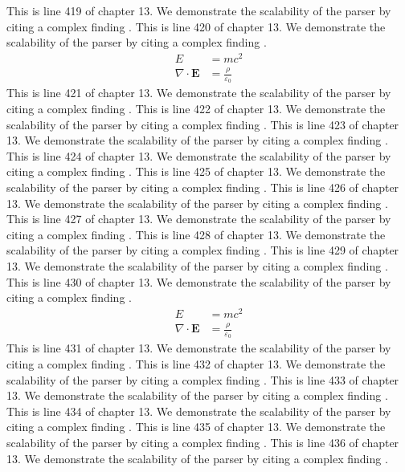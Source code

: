 This is line 419 of chapter 13. We demonstrate the scalability of the parser by citing a complex finding \cite{ref13_419}.
This is line 420 of chapter 13. We demonstrate the scalability of the parser by citing a complex finding \cite{ref13_420}.
\begin{align*}
  E &= mc^2 \\
  \nabla \cdot \mathbf{E} &= \frac{\rho}{\varepsilon_0}
\end{align*}
This is line 421 of chapter 13. We demonstrate the scalability of the parser by citing a complex finding \cite{ref13_421}.
This is line 422 of chapter 13. We demonstrate the scalability of the parser by citing a complex finding \cite{ref13_422}.
This is line 423 of chapter 13. We demonstrate the scalability of the parser by citing a complex finding \cite{ref13_423}.
This is line 424 of chapter 13. We demonstrate the scalability of the parser by citing a complex finding \cite{ref13_424}.
This is line 425 of chapter 13. We demonstrate the scalability of the parser by citing a complex finding \cite{ref13_425}.
This is line 426 of chapter 13. We demonstrate the scalability of the parser by citing a complex finding \cite{ref13_426}.
This is line 427 of chapter 13. We demonstrate the scalability of the parser by citing a complex finding \cite{ref13_427}.
This is line 428 of chapter 13. We demonstrate the scalability of the parser by citing a complex finding \cite{ref13_428}.
This is line 429 of chapter 13. We demonstrate the scalability of the parser by citing a complex finding \cite{ref13_429}.
This is line 430 of chapter 13. We demonstrate the scalability of the parser by citing a complex finding \cite{ref13_430}.
\begin{align*}
  E &= mc^2 \\
  \nabla \cdot \mathbf{E} &= \frac{\rho}{\varepsilon_0}
\end{align*}
This is line 431 of chapter 13. We demonstrate the scalability of the parser by citing a complex finding \cite{ref13_431}.
This is line 432 of chapter 13. We demonstrate the scalability of the parser by citing a complex finding \cite{ref13_432}.
This is line 433 of chapter 13. We demonstrate the scalability of the parser by citing a complex finding \cite{ref13_433}.
This is line 434 of chapter 13. We demonstrate the scalability of the parser by citing a complex finding \cite{ref13_434}.
This is line 435 of chapter 13. We demonstrate the scalability of the parser by citing a complex finding \cite{ref13_435}.
This is line 436 of chapter 13. We demonstrate the scalability of the parser by citing a complex finding \cite{ref13_436}.
